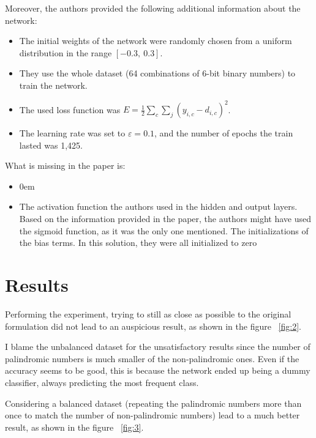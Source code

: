 \documentclass{article}
\begin{document}
    Moreover, the authors provided the following additional information about the network:

    \begin{itemize}
        \itemsep0em %
        \item The initial weights of the network were randomly chosen from a uniform distribution in the range $[-0.3,\ 0.3]$.
        \item They use the whole dataset (64 combinations of 6-bit binary numbers) to train the network.
        \item The used loss function was $E = \frac{1}{2}\sum_{c}\sum_{j}{\left(y_{i,c} - d_{i,c}\right)^2}$.
        \item The learning rate was set to $\varepsilon = 0.1$, and the number of epochs the train lasted was 1,425.
    \end{itemize}

    \noindent What is missing in the paper is:

    \begin{itemize}
        \item \itemsep0em %
        \item The activation function the authors used in the hidden and output layers.
        Based on the information provided in the paper, the authors might have used the sigmoid function, as it was the only one mentioned.
        The initializations of the bias terms.
        In this solution, they were all initialized to zero
    \end{itemize}



    \section{Results}\label{sec:results}

   Performing the experiment, trying to still as close as possible to the original formulation did not lead  to an auspicious result, as shown in the figure ~\ref{fig:2}.

    \noindent I blame the unbalanced dataset for the unsatisfactory results since the number of palindromic numbers is much smaller of the non-palindromic ones.
    Even if the accuracy seems to be good, this is because the network ended up being a dummy classifier, always predicting the most frequent class.


    \noindent Considering a balanced dataset (repeating the palindromic numbers more than once to match the number of non-palindromic numbers)
    lead to a much better result, as shown in the figure ~\ref{fig:3}.
\end{document}
